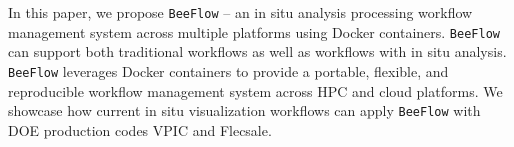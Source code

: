 In this paper, we propose \texttt{BeeFlow} -- an in situ analysis processing workflow management system across multiple platforms using Docker containers. \texttt{BeeFlow} can support both traditional workflows as well as workflows with in situ analysis. \texttt{BeeFlow} leverages Docker containers to provide a portable, flexible, and reproducible workflow management system across HPC and cloud platforms. We showcase how current in situ visualization workflows can apply \texttt{BeeFlow} with DOE production codes VPIC and Flecsale. 